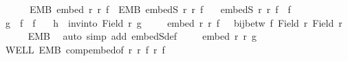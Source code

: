 \begin{isabellebody}
\ \ \ \ \ \ EMB{\isacharcolon}{\kern0pt}\ {\isachardoublequoteopen}embed\ r\ r{\isacharprime}{\kern0pt}\ f{\isachardoublequoteclose}\ \ EMB{\isacharprime}{\kern0pt}{\isacharcolon}{\kern0pt}\ {\isachardoublequoteopen}embedS\ r{\isacharprime}{\kern0pt}\ r{\isacharprime}{\kern0pt}{\isacharprime}{\kern0pt}\ f{\isacharprime}{\kern0pt}{\isachardoublequoteclose}\isanewline
\ \ \ {\isachardoublequoteopen}embedS\ r\ r{\isacharprime}{\kern0pt}{\isacharprime}{\kern0pt}\ {\isacharparenleft}{\kern0pt}f{\isacharprime}{\kern0pt}\ {\isasymcirc}\ f{\isacharparenright}{\kern0pt}{\isachardoublequoteclose}\isanewline
%
\isadelimproof
%
\endisadelimproof
%
\isatagproof
{}\isamarkupfalse%
{\isacharminus}{\kern0pt}\isanewline
\ \ \isamarkupfalse%
\ {\isacharquery}{\kern0pt}g\ {\isacharequal}{\kern0pt}\ {\isachardoublequoteopen}{\isacharparenleft}{\kern0pt}f{\isacharprime}{\kern0pt}\ {\isasymcirc}\ f{\isacharparenright}{\kern0pt}{\isachardoublequoteclose}\ \ \isamarkupfalse%
\ {\isacharquery}{\kern0pt}h\ {\isacharequal}{\kern0pt}\ {\isachardoublequoteopen}inv{\isacharunderscore}{\kern0pt}into\ {\isacharparenleft}{\kern0pt}Field\ r{\isacharparenright}{\kern0pt}\ {\isacharquery}{\kern0pt}g{\isachardoublequoteclose}\isanewline
\ \ \isamarkupfalse%
\ {}{\isacharcolon}{\kern0pt}\ {\isachardoublequoteopen}embed\ r{\isacharprime}{\kern0pt}\ r{\isacharprime}{\kern0pt}{\isacharprime}{\kern0pt}\ f{\isacharprime}{\kern0pt}\ {\isasymand}\ {\isasymnot}\ {\isacharparenleft}{\kern0pt}bij{\isacharunderscore}{\kern0pt}betw\ f{\isacharprime}{\kern0pt}\ {\isacharparenleft}{\kern0pt}Field\ r{\isacharprime}{\kern0pt}{\isacharparenright}{\kern0pt}\ {\isacharparenleft}{\kern0pt}Field\ r{\isacharprime}{\kern0pt}{\isacharprime}{\kern0pt}{\isacharparenright}{\kern0pt}{\isacharparenright}{\kern0pt}{\isachardoublequoteclose}\isanewline
\ \ \ \ \isamarkupfalse%
\ EMB{\isacharprime}{\kern0pt}\ \isamarkupfalse%
\ {\isacharparenleft}{\kern0pt}auto\ simp\ add{\isacharcolon}{\kern0pt}\ embedS{\isacharunderscore}{\kern0pt}def{\isacharparenright}{\kern0pt}\isanewline
\ \ \isamarkupfalse%
\ {}{\isacharcolon}{\kern0pt}\ {\isachardoublequoteopen}embed\ r\ r{\isacharprime}{\kern0pt}{\isacharprime}{\kern0pt}\ {\isacharquery}{\kern0pt}g{\isachardoublequoteclose}\isanewline
\ \ \ \ \isamarkupfalse%
\ WELL\ EMB\ comp{\isacharunderscore}{\kern0pt}embed{\isacharbrackleft}{\kern0pt}of\ r\ r{\isacharprime}{\kern0pt}\ f\ r{\isacharprime}{\kern0pt}{\isacharprime}{\kern0pt}\ f{\isacharprime}{\kern0pt}{\isacharbrackright}{\kern0pt}\ \isamarkupfalse%

\end{isabellebody}
